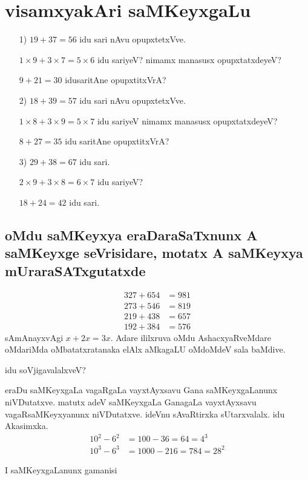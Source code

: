 \chapter{visamxyakAri saMKeyxgaLu}

\begin{itemize}
\item[{\rm 1)}] $19+37 = 56$ idu sari nAvu opupxtetxVve.

$1 \times 9+3 \times 7 = 5 \times 6 $ idu sariyeV? nimamx manasusx opupxtatxdeyeV?

$9+21 =30$ idusaritAne opupxtitxVrA?

\item[{\rm 2)}] $18+39 = 57$ idu sari nAvu opupxtetxVve.

$1 \times 8+3 \times 9 = 5 \times 7 $  idu sariyeV nimamx manasusx opupxtatxdeyeV?

$8 + 27 = 35$ idu saritAne opupxtitxVrA?

\item[{\rm 3)}] $29 + 38 = 67$ idu sari.

$2\times 9 + 3 \times 8 = 6 \times 7$ idu sariyeV?

$18+24 = 42$ idu sari.
\end{itemize}

\section*{oMdu saMKeyxya eraDaraSaTxnunx A saMKeyxge seVrisidare, motatx A saMKeyxya mUraraSATxgutatxde}
\begin{align*}
327+654 &= 981\\
273+546 &= 819\\
219+438 &= 657\\
192+384 &= 576
\end{align*}
sAmAnayxvAgi $x+2x=3x$. Adare ililxruva oMdu AshacxyaRveMdare oMdariMda oMbatatxratanaka elAlx aMkagaLU oMdoMdeV sala baMdive.

idu soVjigavalalxveV?

eraDu saMKeyxgaLa vagaRgaLa vayxtAyxsavu Gana saMKeyxgaLanunx niVDutatxve. matutx adeV saMKeyxgaLa GanagaLa vayxtAyxsavu vagaRsaMKeyxyanunx niVDutatxve. ideVnu sAvaRtirxka sUtarxvalalx. idu Akasimxka.
\begin{align*}
10^2-6^2 &= 100-36 = 64 = 4^3\\
10^3-6^3 &= 1000-216 = 784 = 28^2
\end{align*}

I saMKeyxgaLanunx gamanisi

